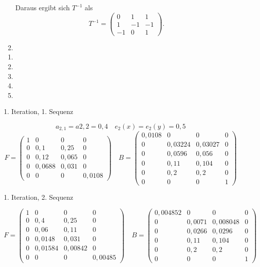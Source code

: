 \documentclass{homework}
\begin{document}
\begin{enumerate}
\begin{enumerate}
Daraus ergibt sich $T^{-1}$ als
$$T^{-1} = \begin{pmatrix}0 & 1 & 1\\1 & -1 & -1\\ -1 & 0 & 1\end{pmatrix}.$$

\item
\end{enumerate}

\begin{enumerate}
\item
\item
\item
\item
\item
\end{enumerate}


1. Iteration, 1. Sequenz

$$a_{2,1} = a{2,2} = 0,4 \quad e_2(x) = e_2(y) = 0,5$$
$$F = \begin{pmatrix}
1 & 0 & 0 & 0\\
0 & 0,1 & 0,25 & 0\\
0 & 0,12 & 0,065 & 0\\
0 & 0,0688 & 0,031 & 0\\
0 & 0 & 0 & 0,0108
\end{pmatrix}
\quad
B = \begin{pmatrix}
0,0108 & 0 & 0 & 0\\
0 & 0,03224 & 0,03027 & 0\\
0 & 0,0596 & 0,056 & 0\\
0 & 0,11 & 0,104 & 0\\
0 & 0,2 & 0,2 & 0\\
0 & 0 & 0 & 1
\end{pmatrix}$$

1. Iteration, 2. Sequenz

$$F = \begin{pmatrix}
1 & 0 & 0 & 0\\
0 & 0,4 & 0,25 & 0\\
0 & 0,06 & 0,11 & 0\\
0 & 0,0148 & 0,031 & 0\\
0 & 0,01584 & 0,00842 & 0\\
0 & 0 & 0 & 0,00485
\end{pmatrix}
\quad
B = \begin{pmatrix}
0,004852 & 0 & 0 & 0\\
0 & 0,0071 & 0,008048 & 0\\
0 & 0,0266 & 0,0296 & 0\\
0 & 0,11 & 0,104 & 0\\
0 & 0,2 & 0,2 & 0\\
0 & 0 & 0 & 1
\end{pmatrix}$$

\end{enumerate}
\end{document}
